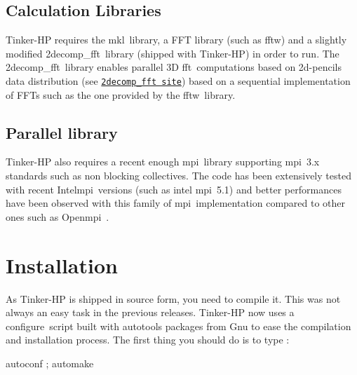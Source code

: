 \subsection*{Calculation Libraries}

Tinker-\/\-H\-P requires the mkl library, a F\-F\-T library (such as fftw) and a slightly modified 2decomp\-\_\-fft library (shipped with Tinker-\/\-H\-P) in order to run. The 2decomp\-\_\-fft library enables parallel 3\-D fft computations based on 2d-\/pencils data distribution (see \href{http://www.2decomp.org}{\tt 2decomp\-\_\-fft site}) based on a sequential implementation of F\-F\-Ts such as the one provided by the fftw library.

\subsection*{Parallel library}

Tinker-\/\-H\-P also requires a recent enough mpi library supporting mpi 3.\-x standards such as non blocking collectives. The code has been extensively tested with recent Intelmpi versions (such as intel mpi 5.1) and better performances have been observed with this family of mpi implementation compared to other ones such as Openmpi .

\section*{Installation}

As Tinker-\/\-H\-P is shipped in source form, you need to compile it. This was not always an easy task in the previous releases. Tinker-\/\-H\-P now uses a {\ttfamily configure} script built with autotools packages from Gnu to ease the compilation and installation process. The first thing you should do is to type \-:

{\ttfamily autoconf ; automake}

